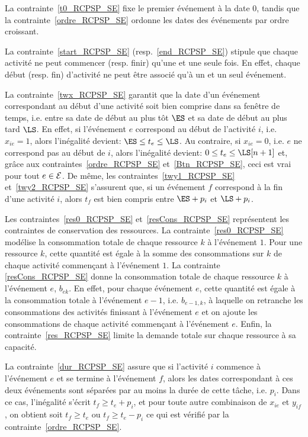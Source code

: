 La contrainte~\eqref{t0_RCPSP_SE} fixe le premier événement à la date
0, tandis que la contrainte~\eqref{ordre_RCPSP_SE} ordonne les dates
des événements par ordre croissant.

La contrainte~\eqref{start_RCPSP_SE} (resp.~\eqref{end_RCPSP_SE})
stipule que chaque activité ne peut commencer (resp. finir) qu'une
et une seule fois. En effet, chaque début (resp. fin) d'activité
ne peut être associé qu'à un et un seul événement.
 
La contrainte~\eqref{twx_RCPSP_SE} garantit que la date d'un
événement correspondant au début d'une activité soit bien comprise
dans sa fenêtre de temps, i.e. entre sa date de début au plus tôt
$\ES$ et sa date de début au plus tard $\LS$. En effet, si
l'événement $e$ correspond au début de l'activité $i$, i.e.
$x_{ie}=1$, alors l'inégalité devient: $\ES \le t_e \le \LS$. Au
contraire, si $x_{ie}=0$, i.e. $e$ ne correspond pas au début de
$i$, alors l'inégalité devient: $0 \le t_e \le \LS[n+1]$ et, grâce
aux contraintes~\eqref{ordre_RCPSP_SE} et~\eqref{Btn_RCPSP_SE},
ceci est vrai pour tout $e \in {\cal E}$. De même, les
contraintes~\eqref{twy1_RCPSP_SE} et~\eqref{twy2_RCPSP_SE}
s'assurent que, si un événement $f$ correspond à la fin d'une
activité $i$, alors $t_f$ est bien compris entre $\ES+p_i$ et
$\LS+p_i$. 

Les contraintes~\eqref{res0_RCPSP_SE}
et~\eqref{resCons_RCPSP_SE} représentent les contraintes de
conservation des ressources. La contrainte~\eqref{res0_RCPSP_SE}
modélise la consommation totale de chaque ressource $k$ à
l'événement $1$. Pour une ressource $k$, cette quantité est égale
à la somme des consommations sur $k$ de chaque activité commençant
à l'événement $1$. La contrainte \eqref{resCons_RCPSP_SE} donne
la consommation totale de chaque ressource $k$ à l'événement $e$,
$b_{ek}$. En effet, pour chaque événement $e$, cette quantité est
égale à la consommation totale à l'événement $e-1$, i.e.
$b_{e-1,k}$, à laquelle on retranche les consommations des
activités finissant à l'événement $e$ et on ajoute les
consommations de chaque activité commençant à l'événement $e$.
Enfin, la contrainte~\eqref{res_RCPSP_SE} limite la demande totale
sur chaque ressource à sa capacité.

La contrainte~\eqref{dur_RCPSP_SE} assure que si l'activité $i$
commence à l'événement $e$ et se termine à l'événement $f$, alors
les dates correspondant à ces deux événements sont séparées par
au moins la durée de cette tâche, i.e. $p_i$. Dans ce cas,
l'inégalité s'écrit $t_f \ge t_e+p_i$, et pour toute autre
combinaison de $x_{ie}$ et $y_{if}$, on obtient soit $t_f \ge
t_e$ ou $t_f\ge t_e- p_i$ ce qui est vérifié par la
contrainte~\eqref{ordre_RCPSP_SE}.

